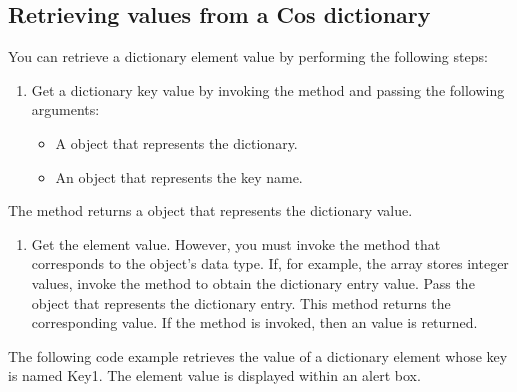 \documentclass[letterpaper,12pt,english,openany,oneside]{sphinxmanual}
\begin{document}
\subsection{Retrieving values from a Cos dictionary}
\label{\detokenize{Plugins_Cos:retrieving-values-from-a-cos-dictionary}}
You can retrieve a dictionary element value by performing the following steps:
\begin{enumerate}
%
\item {} 
Get a dictionary key value by invoking the  method and passing the following arguments:
\begin{itemize}
\item {} 
A  object that represents the dictionary.

\item {} 
An  object that represents the key name.

\end{itemize}

\end{enumerate}

The  method returns a  object that represents the dictionary value.
\begin{enumerate}
%
\setcounter{enumi}{1}
\item {} 
Get the element value. However, you must invoke the method that corresponds to the  object’s data type. If, for example, the  array stores integer values, invoke the  method to obtain the dictionary entry value. Pass the  object that represents the dictionary entry. This method returns the corresponding value. If the  method is invoked, then an  value is returned.

\end{enumerate}

The following code example retrieves the value of a dictionary element whose key is named Key1. The element value is displayed within an alert box.
\end{document}
